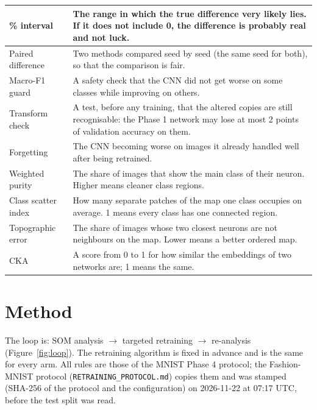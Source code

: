 \documentclass[11pt]{article}
\begin{document}
{\begin{tabularx}{\textwidth}{|>{\raggedright\arraybackslash}p{}|X|}
95\% interval & The range in which the true difference very likely lies. If it does not include 0, the difference is probably real and not luck. \\ \hline
Paired difference & Two methods compared seed by seed (the same seed for both), so that the comparison is fair. \\ \hline
Macro-F1 guard & A safety check that the CNN did not get worse on some classes while improving on others. \\ \hline
Transform check & A test, before any training, that the altered copies are still recognisable: the Phase 1 network may lose at most 2 points of validation accuracy on them. \\ \hline
Forgetting & The CNN becoming worse on images it already handled well after being retrained. \\ \hline
Weighted purity & The share of images that show the main class of their neuron. Higher means cleaner class regions. \\ \hline
Class scatter index & How many separate patches of the map one class occupies on average. 1 means every class has one connected region. \\ \hline
Topographic error & The share of images whose two closest neurons are not neighbours on the map. Lower means a better ordered map. \\ \hline
CKA & A score from 0 to 1 for how similar the embeddings of two networks are; 1 means the same. \\ \hline
\end{tabularx}}

\section{Method}\label{sec:method}

The loop is: SOM analysis $\rightarrow$ targeted retraining $\rightarrow$ re-analysis (Figure~\ref{fig:loop}). The retraining algorithm is fixed in advance and is the same for every arm. All rules are those of the MNIST Phase 4 protocol; the Fashion-MNIST protocol (\texttt{RETRAINING\_PROTOCOL.md}) copies them and was stamped (SHA-256 of the protocol and the configuration) on 2026-11-22 at 07:17 UTC, before the test split was read.
\end{document}
